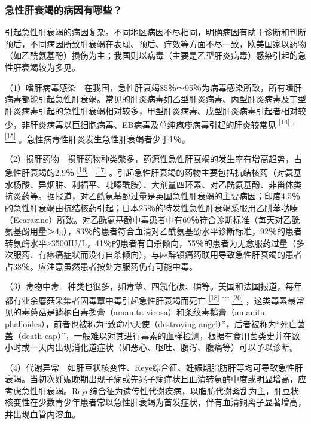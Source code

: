\subsubsection{急性肝衰竭的病因有哪些？}

引起急性肝衰竭的病因复杂。不同地区病因不尽相同，明确病因有助于诊断和判断预后，不同病因所致肝衰竭在表现、预后、疗效等方面不尽一致，欧美国家以药物（如乙酰氨基酚）损伤为主；我国则以病毒（主要是乙型肝炎病毒）感染引起的急性肝衰竭较为多见。

（1）嗜肝病毒感染　在我国，急性肝衰竭85％～95％为病毒感染所致，所有嗜肝病毒都能引起急性肝衰竭。常见的肝炎病毒如乙型肝炎病毒、丙型肝炎病毒及丁型肝炎病毒引起的急性肝衰竭相对较多，甲型肝炎病毒、戊型肝炎病毒引起者相对较少，非肝炎病毒以巨细胞病毒、EB病毒及单纯疱疹病毒引起的肝炎较常见
\protect\hyperlink{text00019.htmlux5cux23ch14-18}{\textsuperscript{{[}14{]}}}
\textsuperscript{,}
\protect\hyperlink{text00019.htmlux5cux23ch15-18}{\textsuperscript{{[}15{]}}}
。急性病毒性肝炎发生急性肝衰竭者少于1％。

（2）损肝药物　损肝药物种类繁多，药源性急性肝衰竭的发生率有增高趋势，占急性肝衰竭的2.9％
\protect\hyperlink{text00019.htmlux5cux23ch16-18}{\textsuperscript{{[}16{]}}}
\textsuperscript{,}
\protect\hyperlink{text00019.htmlux5cux23ch17-18}{\textsuperscript{{[}17{]}}}
。引起急性肝衰竭的药物主要包括抗结核药（对氨基水杨酸、异烟肼、利福平、吡嗪酰胺）、大剂量四环素、对乙酰氨基酚、非甾体类抗炎药等。据报道，对乙酰氨基酚过量是英国急性肝衰竭的主要病因；印度4.5％的急性肝衰竭由抗结核药引起；日本25％的特发性急性肝衰竭系服用乙肼苯哒嗪（Ecarazine）所致。对乙酰氨基酚中毒患者中有69％符合诊断标准（每天对乙酰氨基酚用量＞4g），83％的患者符合血清对乙酰氨基酚水平诊断标准，92％的患者转氨酶水平≥3500IU/L，41％的患者有自杀倾向，55％的患者为无意服药过量（多次服药、有疼痛症状而没有自杀倾向），与麻醉镇痛药联用导致急性肝衰竭的患者占38％。应注意虽然患者按处方服药仍有可能中毒。

（3）毒物中毒　种类也很多，如毒蕈、四氯化碳、磷等。美国和法国报道，每年都有业余蘑菇采集者因毒蕈中毒引起急性肝衰竭而死亡
\protect\hyperlink{text00019.htmlux5cux23ch18-18}{\textsuperscript{{[}18{]}}}
\textsuperscript{～}
\protect\hyperlink{text00019.htmlux5cux23ch20-18}{\textsuperscript{{[}20{]}}}
，这类毒素最常见的毒蘑菇是鳞柄白毒鹅膏（amanita
virosa）和条纹毒鹅膏（amanita
phalloides），前者也被称为“致命小天使（destroying
angel）”，后者被称为“死亡菌盖（death
cap）”，一般难以对其进行毒素的血样检测，根据有食用菌类史并在数小时或一天内出现消化道症状（如恶心、呕吐、腹泻、腹痛等）可以予以诊断。

（4）代谢异常　如肝豆状核变性、Reye综合征、妊娠期脂肪肝等均可导致急性肝衰竭。当初次妊娠晚期出现子痫或先兆子痫症状且血清转氨酶中度或明显增高，应考虑急性肝衰竭。Reye综合征为遗传性代谢疾病，以脂肪代谢紊乱为主，肝豆状核变性在少数青少年患者常以急性肝衰竭为首发症状，伴有血清铜离子显著增高，并出现血管内溶血。

